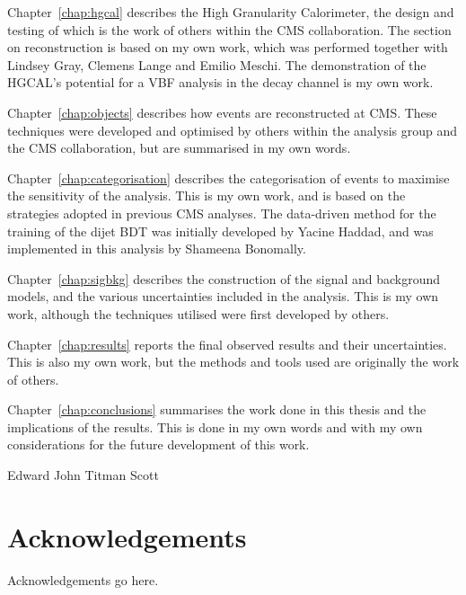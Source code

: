 Chapter~\ref{chap:hgcal} describes the High Granularity Calorimeter, 
the design and testing of which is the work of others within the CMS collaboration. 
The section on reconstruction is based on my own work, 
which was performed together with Lindsey Gray, Clemens Lange and Emilio Meschi.
The demonstration of the HGCAL's potential for a VBF analysis 
in the \Hgg decay channel is my own work.

Chapter~\ref{chap:objects} describes how events are reconstructed at CMS.
These techniques were developed and optimised by others within the \Hgg analysis group 
and the CMS collaboration, but are summarised in my own words.

Chapter~\ref{chap:categorisation} describes the categorisation of events 
to maximise the sensitivity of the analysis.
This is my own work, and is based on the strategies adopted in previous CMS \Hgg analyses.
The data-driven method for the training of the dijet BDT was initially developed by Yacine Haddad, 
and was implemented in this analysis by Shameena Bonomally.

Chapter~\ref{chap:sigbkg} describes the construction of the signal and background models, 
and the various uncertainties included in the analysis.
This is my own work, although the techniques utilised were first developed by others.

Chapter~\ref{chap:results} reports the final observed results and their uncertainties.
This is also my own work, but the methods and tools used are originally the work of others.

Chapter~\ref{chap:conclusions} summarises the work done in this thesis 
and the implications of the results.
This is done in my own words and with my own considerations for the future development of this work.

\begin{flushright}
    Edward John Titman Scott
\end{flushright}


\chapter*{\centering Acknowledgements}
Acknowledgements go here.


\tableofcontents
\listoffigures
\listoftables




\cleardoublepage
